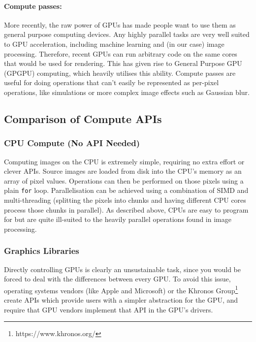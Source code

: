 \documentclass[12pt]{article}
\begin{document}
\paragraph{Compute passes:} More recently, the raw power of GPUs has made people want to use them as
general purpose computing devices.  Any highly parallel tasks are very well suited to GPU
acceleration, including machine learning and (in our case) image processing.  Therefore, recent GPUs
can run arbitrary code on the same cores that would be used for rendering.  This has given rise to
General Purpose GPU (GPGPU) computing, which heavily utilises this ability.  Compute passes are
useful for doing operations that can't easily be represented as per-pixel operations, like
simulations or more complex image effects such as Gaussian blur.

\subsection{Comparison of Compute APIs}

\subsubsection{CPU Compute (No API Needed)}

Computing images on the CPU is extremely simple, requiring no extra effort or clever APIs.  Source
images are loaded from disk into the CPU's memory as an array of pixel values.  Operations can then
be performed on those pixels using a plain \verb|for| loop.  Parallelisation can be achieved
using a combination of SIMD and multi-threading (splitting the pixels into chunks and having
different CPU cores process those chunks in parallel).  As described above, CPUs are easy to program
for but are quite ill-suited to the heavily parallel operations found in image processing.

\subsubsection{Graphics Libraries}

Directly controlling GPUs is clearly an unsustainable task, since you would be forced to deal with
the differences between every GPU.  To avoid this issue, operating systems vendors (like Apple and
Microsoft) or the Khronos Group\footnote{https://www.khronos.org/} create APIs which provide users
with a simpler abstraction for the GPU, and require that GPU vendors implement that API in the GPU's
drivers.
\end{document}
